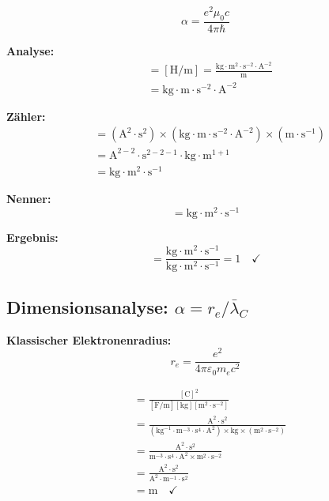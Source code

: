 	\begin{equation}
		\alpha = \frac{e^2\mu_0 c}{4\pi\hbar}
	\end{equation}
	
	\textbf{Analyse:}
	\begin{align}
		[\mu_0] &= [\text{H/m}] = \frac{\text{kg}\cdot\text{m}^2\cdot\text{s}^{-2}\cdot\text{A}^{-2}}{\text{m}} \\
		&= \text{kg}\cdot\text{m}\cdot\text{s}^{-2}\cdot\text{A}^{-2}
	\end{align}
	
	\textbf{Zähler:}
	\begin{align}
		[e^2\mu_0 c] &= (\text{A}^2\cdot\text{s}^2) \times (\text{kg}\cdot\text{m}\cdot\text{s}^{-2}\cdot\text{A}^{-2}) \times (\text{m}\cdot\text{s}^{-1}) \\
		&= \text{A}^{2-2}\cdot\text{s}^{2-2-1}\cdot\text{kg}\cdot\text{m}^{1+1} \\
		&= \text{kg}\cdot\text{m}^2\cdot\text{s}^{-1}
	\end{align}
	
	\textbf{Nenner:}
	\begin{equation}
		[\hbar] = \text{kg}\cdot\text{m}^2\cdot\text{s}^{-1}
	\end{equation}
	
	\textbf{Ergebnis:}
	\begin{equation}
		[\alpha] = \frac{\text{kg}\cdot\text{m}^2\cdot\text{s}^{-1}}{\text{kg}\cdot\text{m}^2\cdot\text{s}^{-1}} = 1 \quad \checkmark
	\end{equation}
	
	\subsection[Dimensionsanalyse: alpha = re/lambdabar]{Dimensionsanalyse: $\alpha = r_e / \bar\lambda_C$}
	
	\textbf{Klassischer Elektronenradius:}
	\begin{equation}
		r_e = \frac{e^2}{4\pi\varepsilon_0 m_e c^2}
	\end{equation}
	
	\begin{align}
		[r_e] &= \frac{[\text{C}]^2}{[\text{F/m}][\text{kg}][\text{m}^2\cdot\text{s}^{-2}]} \\
		&= \frac{\text{A}^2\cdot\text{s}^2}{(\text{kg}^{-1}\cdot\text{m}^{-3}\cdot\text{s}^4\cdot\text{A}^2) \times \text{kg} \times (\text{m}^2\cdot\text{s}^{-2})} \\
		&= \frac{\text{A}^2\cdot\text{s}^2}{\text{m}^{-3}\cdot\text{s}^4\cdot\text{A}^2 \times \text{m}^2\cdot\text{s}^{-2}} \\
		&= \frac{\text{A}^2\cdot\text{s}^2}{\text{A}^2\cdot\text{m}^{-1}\cdot\text{s}^2} \\
		&= \text{m} \quad \checkmark
	\end{align}
	
